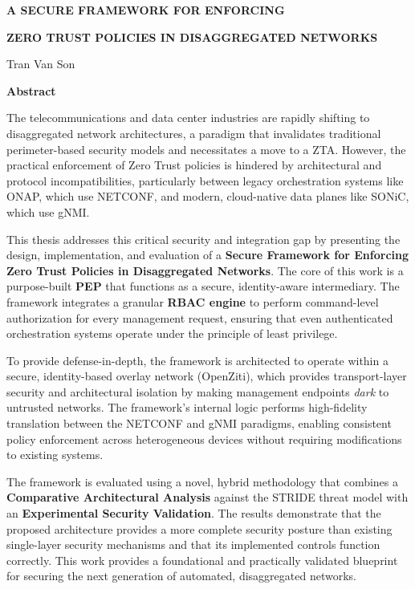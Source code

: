 \documentclass[12pt, a4paper, reqno, oneside]{book}
\begin{document}
\newpage



\centerline{\bf A SECURE FRAMEWORK FOR ENFORCING }
\centerline{\bf ZERO TRUST POLICIES IN DISAGGREGATED NETWORKS }
\vspace{10pt}
\centerline{Tran Van Son}

\vspace{2cm}
{\bf Abstract}
\vspace{5pt}

The telecommunications and data center industries are rapidly shifting to disaggregated network architectures, a paradigm that invalidates traditional perimeter-based security models and necessitates a move to a ZTA. However, the practical enforcement of Zero Trust policies is hindered by architectural and protocol incompatibilities, particularly between legacy orchestration systems like ONAP, which use NETCONF, and modern, cloud-native data planes like SONiC, which use gNMI.

This thesis addresses this critical security and integration gap by presenting the design, implementation, and evaluation of a \textbf{Secure Framework for Enforcing Zero Trust Policies in Disaggregated Networks}. The core of this work is a purpose-built \textbf{PEP} that functions as a secure, identity-aware intermediary. The framework integrates a granular \textbf{RBAC engine} to perform command-level authorization for every management request, ensuring that even authenticated orchestration systems operate under the principle of least privilege.

To provide defense-in-depth, the framework is architected to operate within a secure, identity-based overlay network (OpenZiti), which provides transport-layer security and architectural isolation by making management endpoints \textit{dark} to untrusted networks. The framework's internal logic performs high-fidelity translation between the NETCONF and gNMI paradigms, enabling consistent policy enforcement across heterogeneous devices without requiring modifications to existing systems.

The framework is  evaluated using a novel, hybrid methodology that combines a \textbf{Comparative Architectural Analysis} against the STRIDE threat model with an \textbf{Experimental Security Validation}. The results demonstrate that the proposed architecture provides a more complete security posture than existing single-layer security mechanisms and that its implemented controls function correctly. This work provides a foundational and practically validated blueprint for securing the next generation of automated, disaggregated networks.
\end{document}
